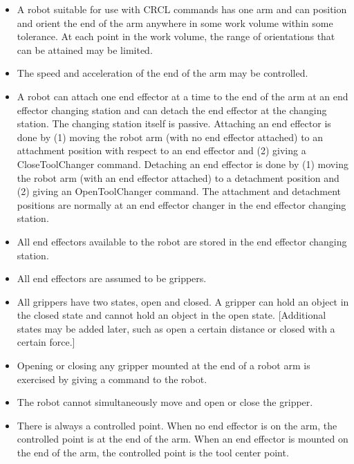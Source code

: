 \begin{itemize}
\item A robot suitable for use with CRCL commands has one arm and can position
and orient the end of the arm anywhere in some work volume within some
tolerance. At each point in the work volume, the range of orientations that
can be attained may be limited.

\item The speed and acceleration of the end of the arm may be controlled.

\item A robot can attach one end effector at a time to the end of the arm at an
end effector changing station and can detach the end effector at the
changing station. The changing station itself is passive.  Attaching an end
effector is done by (1) moving the robot arm (with no end effector
attached) to an attachment position with respect to an end effector and (2)
giving a CloseToolChanger command. Detaching an end effector is done by (1)
moving the robot arm (with an end effector attached) to a detachment
position and (2) giving an OpenToolChanger command. The attachment and
detachment positions are normally at an end effector changer in the end
effector changing station.

\item All end effectors available to the robot are stored in the end effector
changing station.

\item All end effectors are assumed to be grippers.

\item All grippers have two states, open and closed. A gripper can hold an
object in the closed state and cannot hold an object in the open
state. [Additional states may be added later, such as open a certain
distance or closed with a certain force.]

\item Opening or closing any gripper mounted at the end of a robot arm is
exercised by giving a command to the robot.

\item The robot cannot simultaneously move and open or close the gripper.

\item There is always a controlled point. When no end effector is on the arm,
the controlled point is at the end of the arm. When an end effector
is mounted on the end of the arm, the controlled point is the tool
center point.


\end{itemize}
